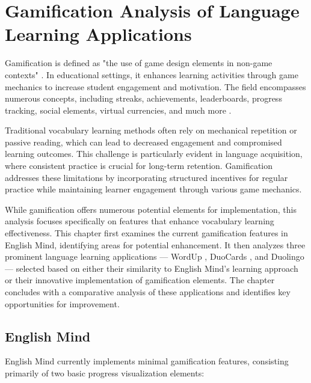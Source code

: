 \chapter{Gamification Analysis of Language Learning Applications}
\label{chap:gamification-analysis}

Gamification is defined as "the use of game design elements in non-game contexts" \cite{cite:deterding2011_gamefulness}. In educational settings, it enhances learning activities through game mechanics to increase student engagement and motivation. The field encompasses numerous concepts, including streaks, achievements, leaderboards, progress tracking, social elements, virtual currencies, and much more \cite{cite:govender2021_gamification_elements_in_language_learning_apps}.

Traditional vocabulary learning methods often rely on mechanical repetition or passive reading, which can lead to decreased engagement and compromised learning outcomes. This challenge is particularly evident in language acquisition, where consistent practice is crucial for long-term retention. Gamification addresses these limitations by incorporating structured incentives for regular practice while maintaining learner engagement through various game mechanics.

While gamification offers numerous potential elements for implementation, this analysis focuses specifically on features that enhance vocabulary learning effectiveness. This chapter first examines the current gamification features in English Mind, identifying areas for potential enhancement. It then analyzes three prominent language learning applications — WordUp \cite{cite:wordup}, DuoCards \cite{cite:duocards}, and Duolingo \cite{cite:duolingo} — selected based on either their similarity to English Mind's learning approach or their innovative implementation of gamification elements. The chapter concludes with a comparative analysis of these applications and identifies key opportunities for improvement.\newpage

\section{English Mind}

English Mind currently implements minimal gamification features, consisting primarily of two basic progress visualization elements:

